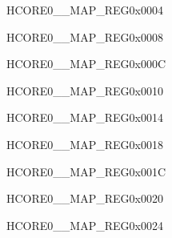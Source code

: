 \begin{register}{H}{CORE0\_\_MAP\_REG}{0x0004}\label{regdesc:CORE0LPWDTINTMAPREG}
\end{register}\vspace{-3em}


\begin{register}{H}{CORE0\_\_MAP\_REG}{0x0008}\label{regdesc:CORE0LPTIMERREG0INTMAPREG}
\end{register}\vspace{-3em}


\begin{register}{H}{CORE0\_\_MAP\_REG}{0x000C}\label{regdesc:CORE0LPTIMERREG1INTMAPREG}
\end{register}\vspace{-3em}


\begin{register}{H}{CORE0\_\_MAP\_REG}{0x0010}\label{regdesc:CORE0MBHPINTMAPREG}
\end{register}\vspace{-3em}


\begin{register}{H}{CORE0\_\_MAP\_REG}{0x0014}\label{regdesc:CORE0MBLPINTMAPREG}
\end{register}\vspace{-3em}


\begin{register}{H}{CORE0\_\_MAP\_REG}{0x0018}\label{regdesc:CORE0PMUREG0INTMAPREG}
\end{register}\vspace{-3em}


\begin{register}{H}{CORE0\_\_MAP\_REG}{0x001C}\label{regdesc:CORE0PMUREG1INTMAPREG}
\end{register}\vspace{-3em}


\begin{register}{H}{CORE0\_\_MAP\_REG}{0x0020}\label{regdesc:CORE0LPANAPERIINTMAPREG}
\end{register}\vspace{-3em}


\begin{register}{H}{CORE0\_\_MAP\_REG}{0x0024}\label{regdesc:CORE0LPADCINTMAPREG}
\end{register}\vspace{-3em}



